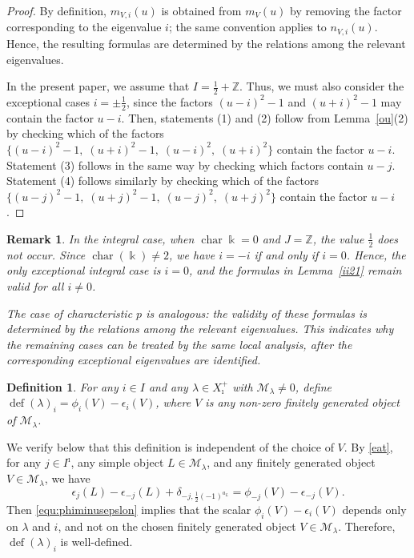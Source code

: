 \documentclass[a4,10pt]{amsart}
\numberwithin{equation}{section}
\newtheorem{Defn}[Theorem]{Definition}
\newtheorem{rem}[Theorem]{Remark}
\theoremstyle{definition}
\begin{document}
\begin{proof}
By definition, $m_{V,i}(u)$ is obtained from $m_V(u)$  by removing
the factor corresponding to the eigenvalue $i$; the same convention applies to 
$n_{V,i}(u)$.
Hence, the resulting formulas are determined by
the relations among the relevant eigenvalues.

In the present paper, we assume that
$I=\frac12+\mathbb Z$. Thus, we must also consider the exceptional cases  
$i=\pm\frac12$,
since the factors $(u-i)^2-1$ and $(u+i)^2-1$
may  contain the factor  $u-i$.
Then,  statements (1) and (2) follow from Lemma~\ref{ou}(2) by checking which of the  factors  
$\{(u-i)^2-1,\; (u+i)^2-1,\; (u-i)^2,\; (u+i)^2\}$
contain the factor $u-i$. Statement (3) follows in the same way by checking which factors contain   $u-j$. Statement (4) follows similarly by checking which of the factors  
$\{(u-j)^2-1,\; (u+j)^2-1,\; (u-j)^2,\; (u+j)^2\}$  
contain the factor $u-i$.
\end{proof}

\begin{rem} In the integral case, 
when $\operatorname{char} \Bbbk=0$
and $J=\mathbb Z$,
the value $\frac12$ does not occur.
Since $\operatorname{char}(\Bbbk)\neq 2$,
we have $i=-i$ if and only if $i=0$.
Hence, the only exceptional integral case is $i=0$,
and the formulas in Lemma~\ref{ii21}
remain valid for all $i\neq 0$.

The case of characteristic $p$ is analogous:
the validity of these formulas is determined by
the relations among the relevant eigenvalues.
This indicates why the remaining  cases can be treated by the same local analysis, after
the corresponding exceptional eigenvalues are identified.
\end{rem}

 
 
 
\begin{Defn}\label{scalar-lambda1} For any  $i\in I$ and any $\lambda\in X_{\imath}^+$ with $\mathcal M_\lambda\neq 0$,  define $\operatorname{def}(\lambda)_i=\phi_i(V)-\epsilon_i(V)$, where  $V$ is any non-zero finitely generated object of   $\mathcal M_\lambda$. 
\end{Defn} 
We verify below that
this definition is
independent of the
choice of $V$.
By \eqref{eat}, for any \(j\in I^\imath\), any simple object
\(L\in\mathcal M_\lambda\), and any finitely generated object
\(V\in\mathcal M_\lambda\), we have
\[
\epsilon_{j}(L)-\epsilon_{-j}(L)
+\delta_{-j,\frac{1}{2}(-1)^{a_L}}
=
\phi_{-j}(V)-\epsilon_{-j}(V).
\]
Then \eqref{equ:phiminusepslon} implies that the scalar
\(\phi_i(V)-\epsilon_i(V)\) depends only on \(\lambda\) and \(i\), and not on
the chosen  finitely generated object  \(V\in\mathcal M_\lambda\). Therefore,
\(\operatorname{def}(\lambda)_i\) is well-defined.
  
\end{document}
